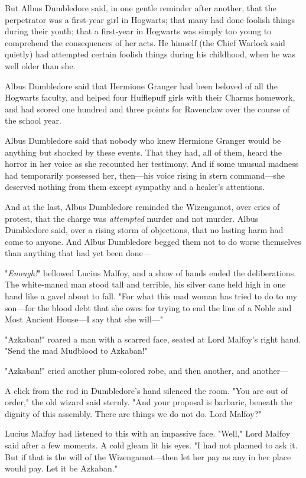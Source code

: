 But Albus Dumbledore said, in one gentle reminder after another, that the
perpetrator was a first-year girl in Hogwarts; that many had done foolish
things during their youth; that a first-year in Hogwarts was simply too young
to comprehend the consequences of her acts. He himself (the Chief Warlock said
quietly) had attempted certain foolish things during his childhood, when he was
well older than she.

Albus Dumbledore said that Hermione Granger had been beloved of all the
Hogwarts faculty, and helped four Hufflepuff girls with their Charms homework,
and had scored one hundred and three points for Ravenclaw over the course of
the school year.

Albus Dumbledore said that nobody who knew Hermione Granger would be anything
but shocked by these events. That they had, all of them, heard the horror in
her voice as she recounted her testimony. And if some unusual madness had
temporarily possessed her, then---his voice rising in stern command---she
deserved nothing from them except sympathy and a healer's attentions.

And at the last, Albus Dumbledore reminded the Wizengamot, over cries of
protest, that the charge was \emph{attempted} murder and not murder. Albus
Dumbledore said, over a rising storm of objections, that no lasting harm had
come to anyone. And Albus Dumbledore begged them not to do worse themselves
than anything that had yet been done---

"\emph{Enough!}" bellowed Lucius Malfoy, and a show of hands ended the
deliberations. The white-maned man stood tall and terrible, his silver cane
held high in one hand like a gavel about to fall. "For what this mad woman has
tried to do to my son---for the blood debt that she owes for trying to end the
line of a Noble and Most Ancient House---I say that she will\mbox{---}"

"Azkaban!" roared a man with a scarred face, seated at Lord Malfoy's right
hand. "Send the mad Mudblood to Azkaban!"

"Azkaban!" cried another plum-colored robe, and then another, and another---

A click from the rod in Dumbledore's hand silenced the room. "You are out of
order," the old wizard said sternly. "And your proposal is barbaric, beneath
the dignity of this assembly. There are things we do not do. Lord Malfoy?"

Lucius Malfoy had listened to this with an impassive face. "Well," Lord Malfoy
said after a few moments. A cold gleam lit his eyes. "I had not planned to ask
it. But if that is the will of the Wizengamot---then let her pay as any in her
place would pay. Let it be Azkaban."

